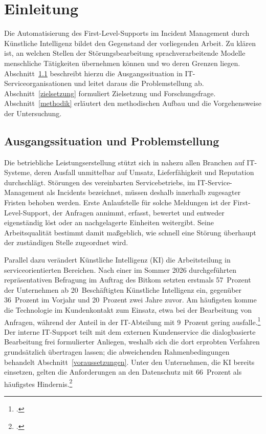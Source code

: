 \section{Einleitung}

Die Automatisierung des First-Level-Supports im Incident Management durch K\"unstliche Intelligenz bildet den Gegenstand der vorliegenden Arbeit. Zu kl\"aren ist, an welchen Stellen der St\"orungsbearbeitung sprachverarbeitende Modelle menschliche T\"atigkeiten \"ubernehmen k\"onnen und wo deren Grenzen liegen. Abschnitt~\ref{ausgangssituation} beschreibt hierzu die Ausgangssituation in IT-Serviceorganisationen und leitet daraus die Problemstellung ab. Abschnitt~\ref{zielsetzung} formuliert Zielsetzung und Forschungsfrage. Abschnitt~\ref{methodik} erl\"autert den methodischen Aufbau und die Vorgehensweise der Untersuchung.

\subsection{Ausgangssituation und Problemstellung}
\label{ausgangssituation}

Die betriebliche Leistungserstellung st\"utzt sich in nahezu allen Branchen auf IT-Systeme, deren Ausfall unmittelbar auf Umsatz, Lieferf\"ahigkeit und Reputation durchschl\"agt. St\"orungen des vereinbarten Servicebetriebs, im IT-Service-Management als Incidents bezeichnet, m\"ussen deshalb innerhalb zugesagter Fristen behoben werden. Erste Anlaufstelle f\"ur solche Meldungen ist der First-Level-Support, der Anfragen annimmt, erfasst, bewertet und entweder eigenst\"andig l\"ost oder an nachgelagerte Einheiten weitergibt. Seine Arbeitsqualit\"at bestimmt damit ma{\ss}geblich, wie schnell eine St\"orung \"uberhaupt der zust\"andigen Stelle zugeordnet wird.

Parallel dazu ver\"andert K\"unstliche Intelligenz (KI) die Arbeitsteilung in serviceorientierten Bereichen. Nach einer im Sommer 2026 durchgef\"uhrten repr\"asentativen Befragung im Auftrag des Bitkom setzten erstmals 57~Prozent der Unternehmen ab 20~Besch\"aftigten K\"unstliche Intelligenz ein, gegen\"uber 36~Prozent im Vorjahr und 20~Prozent zwei Jahre zuvor. Am h\"aufigsten komme die Technologie im Kundenkontakt zum Einsatz, etwa bei der Bearbeitung von Anfragen, w\"ahrend der Anteil in der IT-Abteilung mit 9~Prozent gering ausfalle.\footcite[Vgl.][o.~S.]{Bitkom2026b} Der interne IT-Support teilt mit dem externen Kundenservice die dialogbasierte Bearbeitung frei formulierter Anliegen, weshalb sich die dort erprobten Verfahren grunds\"atzlich \"ubertragen lassen; die abweichenden Rahmenbedingungen behandelt Abschnitt~\ref{voraussetzungen}. Unter den Unternehmen, die KI bereits einsetzen, gelten die Anforderungen an den Datenschutz mit 66~Prozent als h\"aufigstes Hindernis.\footcite[Vgl.][o.~S.]{Bitkom2026b}

